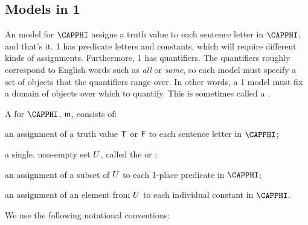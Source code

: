 \subsection{Models in \GQL{}1}\label{Interpretations in GQL1}
An \GSL{} model for $\CAPPHI$ assigns a truth value to each sentence letter in $\CAPPHI$, and that's it. 
\GQL{}1 has predicate letters and constants, which will require different kinds of assignments. 
Furthermore, \GQL{}1 has quantifiers.
The quantifiers roughly correspond to English words such as \emph{all} or \emph{some}, so each model must specify a set of objects that the quantifiers range over.
In other words, a \GQL{}1 model must fix a domain of objects over which to quantify. This is sometimes called a .
\begin{majorILnc}{} 
A  for $\CAPPHI$, $\mathfrak{m}$, consists of:
\begin{cenumerate}
\item an assignment of a truth value $\mathsf{T}$ or $\mathsf{F}$ to each sentence letter in $\CAPPHI$; 
\item a single, non-empty set $U$, called the  or ;
\item an assignment of a subset of $U$ to each 1-place predicate in $\CAPPHI$;
\item an assignment of an element from $U$ to each individual constant in $\CAPPHI$.
\end{cenumerate}
\end{majorILnc}
\noindent{}We use the following notational conventions: 

